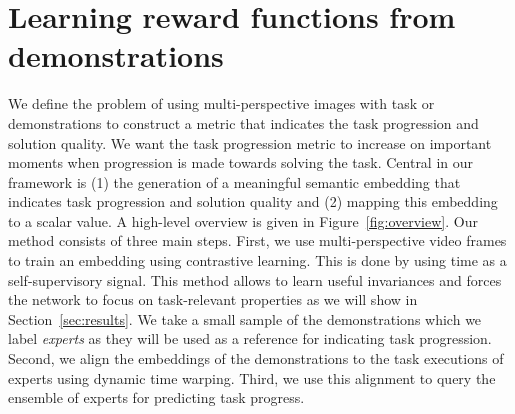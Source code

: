\documentclass[\home/main.tex]{subfiles}
\begin{document}
\chapter{Learning reward functions from demonstrations}\label{ch:reward_functions}


We define the problem of using multi-perspective images with task or demonstrations to construct a metric that indicates the task progression and solution quality. We want the task progression metric to increase on important moments when progression is made towards solving the task. Central in our framework is (1) the generation of a meaningful semantic embedding that indicates task progression and solution quality and (2) mapping this embedding to a scalar value. A high-level overview is given in Figure~\ref{fig:overview}. Our method consists of three main steps. First, we use multi-perspective video frames to train an embedding using contrastive learning. This is done by using time as a self-supervisory signal. This method allows to learn useful invariances and forces the network to focus on task-relevant properties as we will show in Section~\ref{sec:results}. We take a small sample of the demonstrations which we label \textit{experts} as they will be used as a reference for indicating task progression. Second, we align the embeddings of the demonstrations to the task executions of experts using dynamic time warping. Third, we use this alignment to query the ensemble of experts for predicting task progress.


\end{document}
